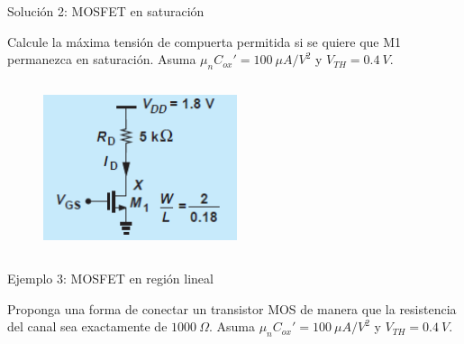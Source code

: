 \documentclass[t,aspectratio=169,10pt]{beamer}
\begin{document}
\begin{frame}{Solución 2: MOSFET en saturación}

Calcule la máxima tensión de compuerta permitida si se quiere que M1 permanezca en saturación. Asuma $\mu_n C_{ox}' = 100\ \mu{}A/V^2$ y $V_{TH} = 0.4\ V$.

\begin{columns}

\begin{column}{0.5\textwidth}

\begin{figure}[H]
    \centering
    \includegraphics[width=0.7\textwidth]{figuras/mosfet_ejemplo_2.png}
\end{figure}

\end{column}

\begin{column}{0.5\textwidth}

\end{column}

\end{columns}
    
\end{frame}



\begin{frame}{Ejemplo 3: MOSFET en región lineal}

Proponga una forma de conectar un transistor MOS de manera que la resistencia del canal sea exactamente de $1000\ \Omega$. Asuma $\mu_n C_{ox}' = 100\ \mu{}A/V^2$ y $V_{TH} = 0.4\ V$.
    
\end{frame}
\end{document}
